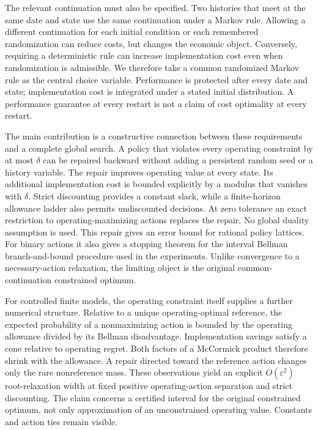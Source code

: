 The relevant continuation must also be specified. Two histories that meet at the same date and state use the same continuation under a Markov rule. Allowing a different continuation for each initial condition or each remembered randomization can reduce costs, but changes the economic object. Conversely, requiring a deterministic rule can increase implementation cost even when randomization is admissible. We therefore take a common randomized Markov rule as the central choice variable. Performance is protected after every date and state; implementation cost is integrated under a stated initial distribution. A performance guarantee at every restart is not a claim of cost optimality at every restart.

The main contribution is a constructive connection between these requirements and a complete global search. A policy that violates every operating constraint by at most $\delta$ can be repaired backward without adding a persistent random seed or a history variable. The repair improves operating value at every state. Its additional implementation cost is bounded explicitly by a modulus that vanishes with $\delta$. Strict discounting provides a constant slack, while a finite-horizon allowance ladder also permits undiscounted decisions. At zero tolerance an exact restriction to operating-maximizing actions replaces the repair. No global duality assumption is used. This repair gives an error bound for rational policy lattices. For binary actions it also gives a stopping theorem for the interval Bellman branch-and-bound procedure used in the experiments. Unlike convergence to a necessary-action relaxation, the limiting object is the original common-continuation constrained optimum.

For controlled finite models, the operating constraint itself supplies a further numerical structure. Relative to a unique operating-optimal reference, the expected probability of a nonmaximizing action is bounded by the operating allowance divided by its Bellman disadvantage. Implementation savings satisfy a cone relative to operating regret. Both factors of a McCormick product therefore shrink with the allowance. A repair directed toward the reference action changes only the rare nonreference mass. These observations yield an explicit $O(\varepsilon^2)$ root-relaxation width at fixed positive operating-action separation and strict discounting. The claim concerns a certified interval for the original constrained optimum, not only approximation of an unconstrained operating value. Constants and action ties remain visible.

